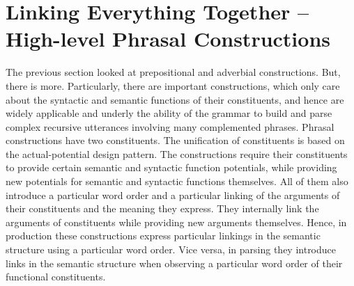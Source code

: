 \section{Linking Everything Together -- High-level Phrasal Constructions}
\label{s:phrasal}
The previous section looked at prepositional and adverbial constructions. 
But, there is more. Particularly, there are important constructions, which only care 
about the syntactic and semantic functions of their constituents, and hence are 
widely applicable and underly the ability of the grammar to build and parse 
complex recursive utterances involving many complemented phrases. Phrasal 
constructions have two constituents. The unification of constituents is based on 
the actual-potential design pattern. The constructions require their constituents 
to provide certain semantic and syntactic function potentials, while providing 
new potentials for semantic and syntactic functions themselves. 
All of them also introduce a particular word order and a particular linking 
of the arguments of their constituents and the meaning they express. They internally link
the arguments of constituents while providing new arguments themselves.
Hence, in production these constructions express particular linkings in the semantic structure using a particular word order. Vice versa, in parsing they introduce links in the semantic structure when observing a particular word order
of their functional constituents. 

